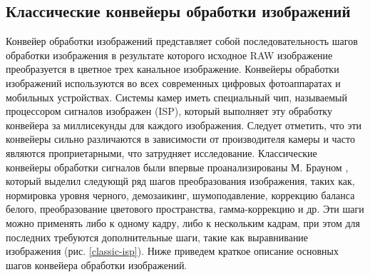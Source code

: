 \subsection{Классические конвейеры обработки изображений}\label{sect-2-1}

Конвейер обработки изображений представляет собой последовательность шагов обработки изображения в результате которого исходное RAW изображение преобразуется в цветное трех канальное изображение. Конвейеры обработки изображений используются во всех современных цифровых фотоаппаратах и мобильных устройствах. Системы камер
иметь специальный чип, называемый процессором сигналов изображен (ISP), который выполняет эту обработку конвейера за миллисекунды для каждого изображения. Следует отметить, что эти конвейеры сильно различаются в зависимости от производителя камеры и часто являются проприетарными, что затрудняет исследование.  Классические конвейеры обработки сигналов были впервые проанализированы М. Брауном \cite{lib-borwn}, который выделил следующй ряд шагов преобразования изображения, таких как, нормировка уровня черного, демозаикинг, шумоподавление, коррекцию баланса белого, преобразование цветового пространства, гамма-коррекцию и др. Эти шаги можно применять либо к одному кадру, либо к нескольким кадрам, при этом для последних требуются дополнительные шаги, такие как выравнивание изображения (рис. \ref{classic-isp}). Ниже приведем краткое описание основных шагов конвейера обработки изображений.


